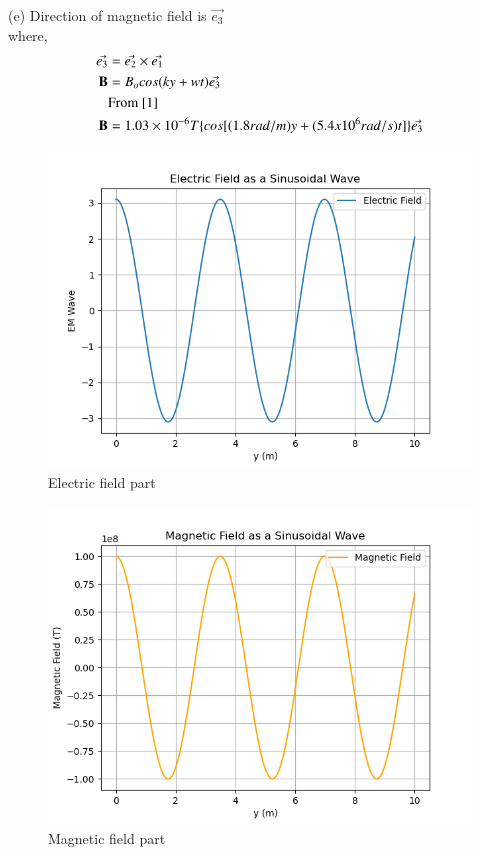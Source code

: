\documentclass[journal,12pt,twocolumn]{IEEEtran}
\theoremstyle{remark}
\begin{document}
(e)
Direction of magnetic field is $\vec{e_3}$\\
where,
\begin{align}
	\vec{e_3}&=\vec{e_2} \times \vec{e_1}\\
	\textbf{B}&=B_ocos(ky+wt)\vec{e_3}\\
	&\notag\text{From \eqref{1}}\\
	\textbf{B}&=1.03\times10^{-6}T\{cos[(1.8rad/m)y+(5.4x10^{6}rad/s)t]\}\vec{e_3}
\end{align}
\begin{figure}[h]
\centering
\includegraphics[width=1\columnwidth]{Ewave.png}
\caption{Electric field part}
\label{solution}
\end{figure}
\begin{figure}[h]
\centering
\includegraphics[width=1\columnwidth]{Mwave.png}
\caption{Magnetic field part}
\label{solution}
\end{figure}
\end{document}
